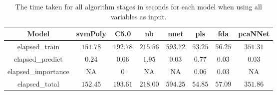 \begin{table}[!ht]
	\centering
	\begin{tabular}{|c|c|c|c|c|c|c|c|}
		\hline
		Model & svmPoly & C5.0 & nb & nnet & pls & fda & pcaNNet \\ \hline
		elapsed_train & $151.78$ & $192.78$ & $215.56$ & $593.72$ & $53.25$ & $56.25$ & $351.31$ \\ \hline
		elapsed_predict & $0.24$ & $0.06$ & $1.95$ & $0.03$ & $0.77$ & $0.03$ & $0.03$ \\ \hline
		elapsed_importance & NA & $0$ & NA & NA & $0.06$ & $0.03$ & NA \\ \hline
		elapsed_total & $152.45$ & $193.61$ & $218.00$ & $594.25$ & $54.85$ & $57.09$ & $351.86$ \\ \hline
	\end{tabular}
	\caption{The time taken for all algorithm stages in seconds for each model when using all variables as input.}
	\label{tab:time:reverse:all}
\end{table}
